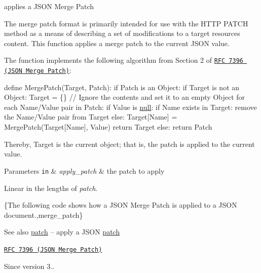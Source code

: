 applies a J\+S\+ON Merge Patch 

The merge patch format is primarily intended for use with the H\+T\+TP P\+A\+T\+CH method as a means of describing a set of modifications to a target resource\textquotesingle{}s content. This function applies a merge patch to the current J\+S\+ON value.

The function implements the following algorithm from Section 2 of \href{https://tools.ietf.org/html/rfc7396}{\tt R\+FC 7396 (J\+S\+ON Merge Patch)}\+:


\begin{DoxyCode}
define MergePatch(Target, Patch):
  if Patch is an Object:
    if Target is not an Object:
      Target = \{\} \textcolor{comment}{// Ignore the contents and set it to an empty Object}
    \textcolor{keywordflow}{for each} Name/Value pair in Patch:
      \textcolor{keywordflow}{if} Value is \hyperlink{namespacenlohmann_1_1detail_a1ed8fc6239da25abcaf681d30ace4985a37a6259cc0c1dae299a7866489dff0bd}{null}:
        \textcolor{keywordflow}{if} Name exists in Target:
          \textcolor{keyword}{remove} the Name/Value pair from Target
      \textcolor{keywordflow}{else}:
        Target[Name] = MergePatch(Target[Name], Value)
    return Target
  else:
    return Patch
\end{DoxyCode}


Thereby, {\ttfamily Target} is the current object; that is, the patch is applied to the current value.


\begin{DoxyParams}[1]{Parameters}
\mbox{\tt in}  & {\em apply\+\_\+patch} & the patch to apply\\
\hline
\end{DoxyParams}
Linear in the lengths of {\itshape patch}.

\{The following code shows how a J\+S\+ON Merge Patch is applied to a J\+S\+ON document.,merge\+\_\+patch\}

\begin{DoxySeeAlso}{See also}
\hyperlink{classnlohmann_1_1basic__json_ad87518a27b13f886b836bb93213e6515}{patch} -- apply a J\+S\+ON \hyperlink{classnlohmann_1_1basic__json_ad87518a27b13f886b836bb93213e6515}{patch} 

\href{https://tools.ietf.org/html/rfc7396}{\tt R\+FC 7396 (J\+S\+ON Merge Patch)}
\end{DoxySeeAlso}
\begin{DoxySince}{Since}
version 3.. 
\end{DoxySince}
